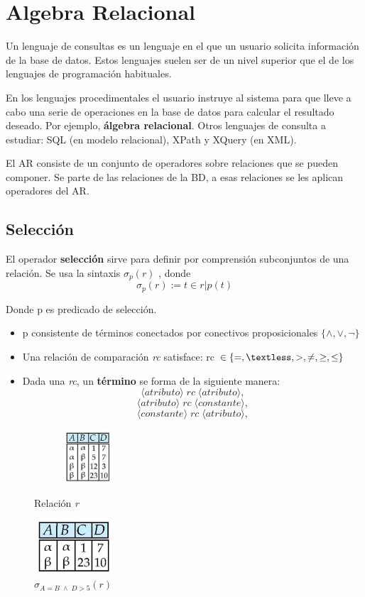 \documentclass[12pt,a4paper]{report}
\newcounter{neq}
\begin{document}
			
\chapter{Algebra Relacional}
		\par Un lenguaje de consultas es un lenguaje en el que un usuario solicita información de la base de datos. Estos lenguajes suelen ser de un nivel superior que el de los lenguajes de programación habituales.
		\par En los lenguajes procedimentales el usuario instruye al sistema para que lleve a cabo una serie de operaciones en la base de datos para calcular el resultado deseado. Por ejemplo, \textbf{álgebra relacional}. Otros lenguajes de consulta a estudiar: SQL (en modelo relacional), XPath y XQuery (en XML).
		\par El AR consiste de un conjunto de operadores sobre relaciones que se pueden componer. Se parte de las relaciones de la BD, a esas relaciones se les aplican operadores del AR.
	
	\section{Selección}
		\par El operador \textbf{selección} sirve para definir por comprensión subconjuntos de una relación. Se usa la sintaxis $\sigma_{p}(r)$ , donde
		\[\sigma_{p}(r) := {t \in r | p(t)} \]
		\par Donde p es predicado de selección.
			\begin{itemize}
				\item p consistente de términos conectados por conectivos proposicionales $\{ \land, \lor, \neg \}$
				\item Una relación de comparación \textit{rc} satisface: rc $\in \{=, \textless, >, \neq, \geq, \leq \}$ 
				\item Dada una \textit{rc}, un \textbf{término} se forma de la siguiente manera:
				\[ \langle atributo \rangle \; rc \; \langle atributo \rangle,\]
				\[ \langle atributo \rangle \; rc \; \langle constante \rangle,\]
				\[ \langle constante \rangle \; rc \; \langle atributo \rangle,\]
			\end{itemize}

			\begin{figure}[htb]
				\centering
				\includegraphics[width=4cm, height=2cm]{./imagenes/seleccion1.png}
				\caption{Relación \textit{r}}
				\includegraphics[width=3cm, height=2cm]{./imagenes/seleccion2.png}
				\caption{$\sigma_{A=B \; \land \; D > 5}(r)$}
			\end{figure}
\end{document}
